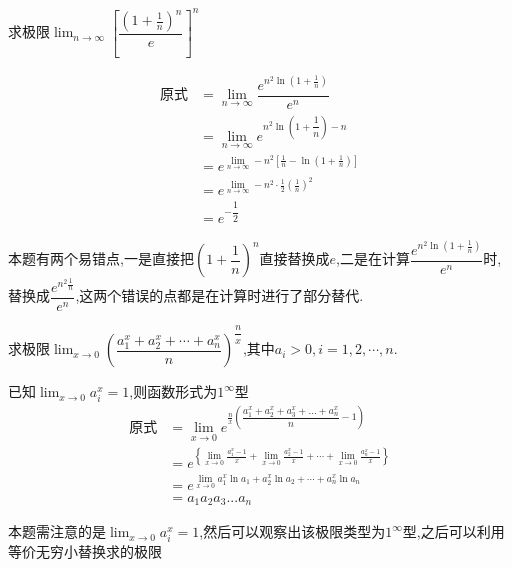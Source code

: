 \documentclass[8pt a4paper, oneside, UTF8]{ctexbook}
\begin{document}
\begin{sloppypar}
\begin{solution}
        \end{solution} 
        \begin{problem}
            求极限$\lim_{n\to\infty}\left[\dfrac{\left(1+\frac1n\right)^n}e\right]^n$        
        \end{problem}
        \begin{solution}
            \begin{align*}
                \text{原式} & = \lim_{n\to \infty} \dfrac{e^{n^2\ln(1+\frac{1}{n})}}{e^n}\\
                & = \lim_{n\to \infty} e^{n^2\ln(1+\dfrac{1}{n})-n}\\
                & = e^{\lim_{n\to\infty}-n^2{\left[\frac1n-\ln(1+\frac1n)\right]}}\\
                & = e^{\lim_{n\to\infty}-n^2\cdot\frac12(\frac1n)^2}\\
                & =e^{-\dfrac{1}{2}}
            \end{align*}   
        \end{solution}
        \begin{note}
            本题有两个易错点,一是直接把$(1+\dfrac{1}{n})^n$直接替换成$e$,二是在计算$\dfrac{e^{n^2\ln(1+\frac{1}{n})}}{e^n}$时,替换成$\dfrac{e^{n^2\frac{1}{n}}}{e^n}$,这两个错误的点都是在计算时进行了部分替代.
        \end{note}
    \begin{problem}
        求极限$\lim_{x\to0}\left(\dfrac{a_1 ^x+a_2^x+\cdots+a_n^x}n\right)^{\dfrac nx}$,其中$a_i>0,i=1,2,\cdots,n.$ 
    \end{problem}
    \begin{solution}
        已知$\lim_{x\to 0} a_i^x = 1$,则函数形式为$1^{\infty}$型
        \begin{align*}
          \text{原式} & = \lim_{x\to 0} e^{\frac{n}{x}(\dfrac{a_1^x+a_2^x+a_3^x+...+a_n^x}{n}-1)}\\
          & = e^{\left\{\lim_{x\to0}\frac{a_{1}^{x}-1}{x}+\lim_{x\to0}\frac{a_{2}^{x}-1}{x}+\cdots+\lim_{x\to0}\frac{a_{n}^{x}-1}{x}\right\}}\\
          & = e^{\lim_{x\to0}a_{1}^{x}\ln a_{1}+a_{2}^{x}\ln a_{2}+\cdots+a_{n}^{x}\ln a_{n}}\\
          & = a_1 a_2 a_3 ... a_n
        \end{align*}
    \end{solution}
    \begin{note}
        本题需注意的是$\lim_{x\to 0} a_i^x = 1$,然后可以观察出该极限类型为$1^{\infty}$型,之后可以利用等价无穷小替换求的极限
    \end{note}

\end{sloppypar}
\end{document}
